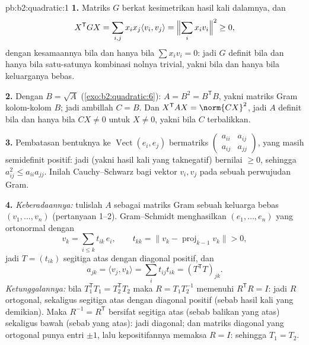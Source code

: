 \begin{solution}{pb:b2:quadratic:1}
\textbf{1.} Matriks $G$  berkat kesimetrikan hasil kali dalamnya,
dan
\[
X^{\mathsf T}GX = \sum_{i,j}x_ix_j\langle v_i, v_j\rangle
= \Bigl\|\sum_i x_iv_i\Bigr\|^2 \geq 0 ,
\]
dengan kesamaannya bila dan hanya bila $\sum x_iv_i = 0$: jadi $G$ definit
bila dan hanya bila satu-satunya kombinasi nolnya trivial, yakni bila dan hanya
bila keluarganya bebas.

\textbf{2.} Dengan $B = \sqrt A$ (\cref{exo:b2:quadratic:6}): $A
= B^2 = B^{\mathsf T}B$, yakni matriks Gram kolom-kolom $B$;
jadi ambillah $C = B$. Dan $X^{\mathsf T}AX = \norm{CX}^2$, jadi $A$
definit bila dan hanya bila $CX \neq 0$ untuk $X \neq 0$, yakni bila $C$ terbalikkan.

\textbf{3.} Pembatasan bentuknya ke
$\operatorname{Vect}(e_i, e_j)$ bermatriks
$\begin{pmatrix} a_{ii} & a_{ij}\\ a_{ij} & a_{jj}
\end{pmatrix}$, yang masih semidefinit positif: jadi 
(yakni hasil kali  yang taknegatif) bernilai $\geq 0$, sehingga
$a_{ij}^2 \leq a_{ii}a_{jj}$. Inilah Cauchy--Schwarz bagi
vektor $v_i, v_j$ pada sebuah perwujudan Gram.

\textbf{4.} \emph{Keberadaannya:} tulislah $A$ sebagai matriks Gram
sebuah keluarga bebas $(v_1, \dots, v_n)$ (pertanyaan 1--2).
Gram--Schmidt menghasilkan $(e_1, \dots, e_n)$ yang ortonormal dengan
\[
v_k = \sum_{i \leq k} t_{ik}\,e_i,
\qquad t_{kk} = \bigl\| v_k - \operatorname{proj}_{k-1}v_k
\bigr\| > 0 ,
\]
jadi $T = (t_{ik})$ segitiga atas dengan diagonal positif,
dan
\[
a_{jk} = \langle v_j, v_k\rangle
= \sum_i t_{ij}t_{ik} = (T^{\mathsf T}T)_{jk} .
\]
\emph{Ketunggalannya:} bila $T_1^{\mathsf T}T_1 = T_2^{\mathsf T}T_2$
maka $R = T_1T_2^{-1}$ memenuhi $R^{\mathsf T}R = I$: jadi $R$
ortogonal, sekaligus segitiga atas dengan diagonal positif
(sebab hasil kali yang demikian). Maka $R^{-1} = R^{\mathsf T}$ bersifat
segitiga atas (sebab balikan yang atas) sekaligus bawah (sebab  yang
atas): jadi diagonal; dan matriks diagonal yang ortogonal punya
entri $\pm1$, lalu kepositifannya memaksa $R = I$: sehingga $T_1 = T_2$.


\end{solution}
